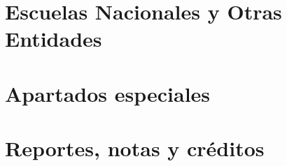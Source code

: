 \documentclass{article}
\begin{document}
\part{Escuelas Nacionales y Otras Entidades}













\part{Apartados especiales}







\part{Reportes, notas y créditos}


\end{document}
